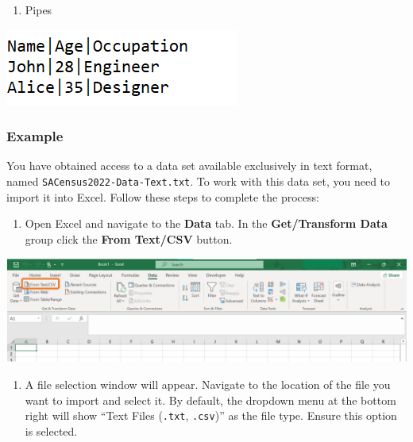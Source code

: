 \documentclass[
]{book}
\providecommand{\tightlist}{%
  \setlength{\itemsep}{0pt}\setlength{\parskip}{0pt}}
\begin{document}
\begin{enumerate}
\def\labelenumi{\arabic{enumi}.}
\setcounter{enumi}{3}
\tightlist
\item
  Pipes
\end{enumerate}

\begin{center}\includegraphics[width=0.4\linewidth]{Figures/import_pipes} \end{center}

\subsubsection{Example}\label{example}

You have obtained access to a data set available exclusively in text format, named \texttt{SACensus2022-Data-Text.txt}. To work with this data set, you need to import it into Excel. Follow these steps to complete the process:

\begin{enumerate}
\def\labelenumi{\arabic{enumi}.}
\tightlist
\item
  Open Excel and navigate to the \textbf{Data} tab. In the \textbf{Get/Transform Data} group click the \textbf{From Text/CSV} button.
\end{enumerate}

\begin{center}\includegraphics[width=0.7\linewidth]{Figures/import_1} \end{center}

\newpage

\begin{enumerate}
\def\labelenumi{\arabic{enumi}.}
\setcounter{enumi}{1}
\tightlist
\item
  A file selection window will appear. Navigate to the location of the file you want to import and select it. By default, the dropdown menu at the bottom right will show ``Text Files (\texttt{.txt}, \texttt{.csv})'' as the file type. Ensure this option is selected.
\end{enumerate}
\end{document}

